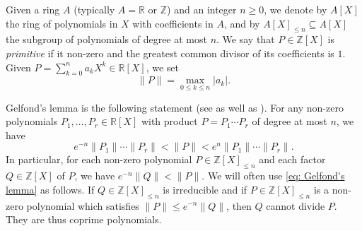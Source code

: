 \documentclass[JEP,XML,SOM,Unicode,NoFloatCountersInSection,published]{cedram}
\newcommand\bR{\mathbb{R}}
\newcommand\bZ{\mathbb{Z}}
\newcommand{\normH}[1]{\|#1\|}
\let\subset \subseteq
\theoremstyle{definition}
\theoremstyle{plain}
\begin{document}
Given a ring $A$ (typically $A=\bR$ or $\bZ$) and an integer $n\geq 0$, we denote by $A[X]$ the ring of polynomials in $X$ with coefficients in $A$, and by $A[X]_{\leq n} \subset A[X]$ the subgroup of polynomials of degree at most $n$. We say that $P\in\bZ[X]$ is \emph{primitive} if it non-zero and the greatest common divisor of its coefficients is $1$. Given $P=\sum_{k=0}^{n} a_kX^k \in \bR[X]$, we set
\begin{equation*}
\normH{P} = \max_{0\leq k \leq n} |a_k|.
\end{equation*}

Gelfond's lemma is the following statement (see \eg \cite[Lem.\,A.3]{bugeaud2004approximation} as well as \cite{brownawell1974sequences}). For any non-zero polynomials $P_1,\dots,P_r\in\bR[X]$ with product $P = P_1\cdots P_r$ of degree at most $n$, we have
\begin{equation}
\label{eq: Gelfond's lemma}
e^{-n} \normH{P_1}\cdots \normH{P_r} < \normH{P} < e^{n} \normH{P_1}\cdots \normH{P_r}.
\end{equation}
In particular, for each non-zero polynomial $P \in \bZ[X]_{\leq n}$ and each factor $Q\in\bZ[X]$ of $P$, we have $e^{-n}\normH{Q} < \normH{P}$. We will often use \eqref{eq: Gelfond's lemma} as follows. If $Q\in\bZ[X]_{\leq n}$ is irreducible and if $P\in\bZ[X]_{\leq n}$ is a non-zero polynomial which satisfies $\normH{P} \leq e^{-n}\normH{Q}$, then $Q$ cannot divide $P$. They are thus coprime polynomials.
\end{document}
